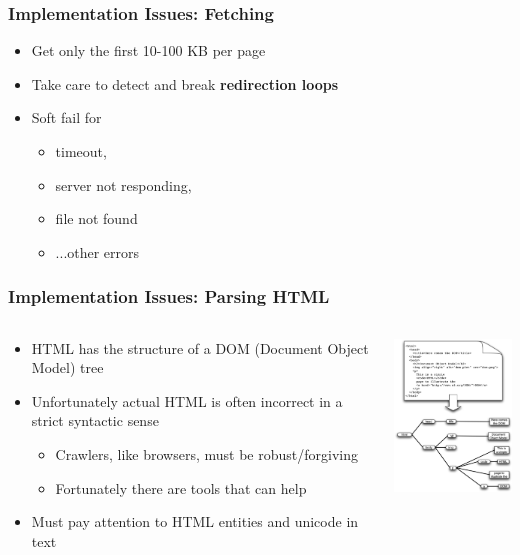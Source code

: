 \documentclass{beamer}
\begin{document}
\begin{frame} \frametitle{Implementation Issues: Fetching}
\begin{itemize}
\item  Get only the first 10-100 KB per page

\item Take care to detect and break {\bf redirection loops}

\item Soft fail for 
\begin{itemize}
\item timeout, 
\item server not responding,
\item file not found
\item ...other errors
\end{itemize}

\end{itemize}

\end{frame}


\begin{frame} \frametitle{Implementation Issues: Parsing HTML}

\begin{columns}[T]
\begin{column}{0.5\textwidth}
\begin{itemize}

\item HTML has the structure of a DOM (Document Object Model) tree

\item Unfortunately actual HTML is often incorrect in a strict syntactic sense
\begin{itemize}
\item Crawlers, like browsers, must be robust/forgiving
\item Fortunately there are tools that can help
\end{itemize}
\item Must pay attention to HTML entities and unicode in text

\end{itemize}
\end{column}

\begin{column}{.5\textwidth}
      \includegraphics[width=4cm]{crawler-parsing}
\end{column}

\end{columns}

\end{frame}
\end{document}
